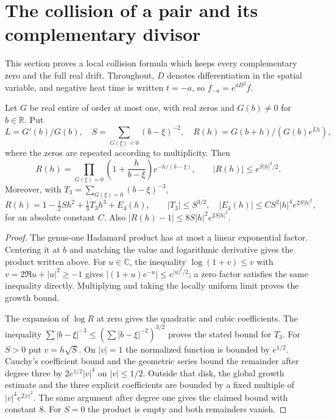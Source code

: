 \section{The collision of a pair and its complementary divisor}
\label{sec:isolated-pair}

This section proves a local collision formula which keeps every complementary zero and the full real drift. Throughout, $D$ denotes differentiation in the spatial variable, and negative heat time is written $t=-a$, so $f_{-a}=e^{aD^2}f$.

\begin{lemma}\label{lem:centered-product}
Let $G$ be real entire of order at most one, with real zeros and $G(b)\ne0$ for $b\in\mathbb R$. Put
\[
 L=G'(b)/G(b),\quad S=\sum_{G(\xi)=0}(b-\xi)^{-2},\quad
 R(h)=G(b+h)/(G(b)e^{Lh}),
\]
where the zeros are repeated according to multiplicity. Then
\[
 R(h)=\prod_{G(\xi)=0}
       \left(1+\frac h{b-\xi}\right)e^{-h/(b-\xi)},
 \qquad |R(h)|\le e^{S|h|^2/2}.
\]
Moreover, with $T_3=\sum_{G(\xi)=0}(b-\xi)^{-3}$,
\[
 R(h)=1-\tfrac12Sh^2+\tfrac13T_3h^3+E_4(h),\qquad
 |T_3|\le S^{3/2},\quad
 |E_4(h)|\le C S^2|h|^4e^{2S|h|^2},
\]
for an absolute constant $C$. Also
$|R(h)-1|\le8S|h|^2e^{2S|h|^2}$.
\end{lemma}
\begin{proof}
The genus-one Hadamard product has at most a linear exponential factor. Centering it at $b$ and matching the value and logarithmic derivative gives the product written above. For $u\in\mathbb C$, the inequality
$\log(1+v)\le v$ with $v=2\Re u+|u|^2\ge-1$ gives
$|(1+u)e^{-u}|\le e^{|u|^2/2}$; a zero factor satisfies the same inequality directly. Multiplying and taking the locally uniform limit proves the growth bound.

The expansion of $\log R$ at zero gives the quadratic and cubic coefficients. The inequality
$\sum |b-\xi|^{-3}\le(\sum |b-\xi|^{-2})^{3/2}$ proves the stated bound for $T_3$.
For $S>0$ put $v=h\sqrt S$. On $|v|=1$ the normalized function is bounded by $e^{1/2}$. Cauchy's coefficient bound and the geometric series bound the remainder after degree three by $2e^{1/2}|v|^4$ on $|v|\le1/2$. Outside that disk, the global growth estimate and the three explicit coefficients are bounded by a fixed multiple of $|v|^4e^{2|v|^2}$. The same argument after degree one gives the claimed bound with constant $8$. For $S=0$ the product is empty and both remainders vanish.
\end{proof}

